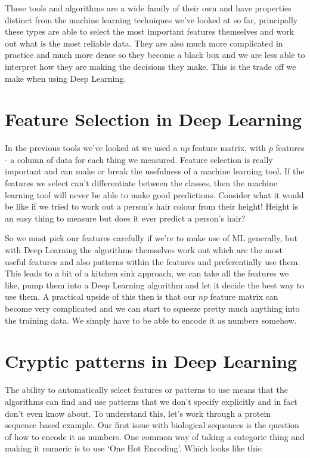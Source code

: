 \documentclass[
]{book}
\begin{document}
These tools and algorithms are a wide family of their own and have properties distinct from the machine learning techniques we've looked at so far, principally these types are able to select the most important features themselves and work out what is the most reliable data. They are also much more complicated in practice and much more dense so they become a black box and we are less able to interpret how they are making the decisions they make. This is the trade off we make when using Deep Learning.

\hypertarget{feature-selection-in-deep-learning}{%
\section{Feature Selection in Deep Learning}\label{feature-selection-in-deep-learning}}

In the previous tools we've looked at we used a \(np\) feature matrix, with \(p\) features - a column of data for each thing we measured. Feature selection is really important and can make or break the usefulness of a machine learning tool. If the features we select can't differentiate between the classes, then the machine learning tool will never be able to make good predictions. Consider what it would be like if we tried to work out a person's hair colour from their height! Height is an easy thing to measure but does it ever predict a person's hair?

So we must pick our features carefully if we're to make use of ML generally, but with Deep Learning the algorithms themselves work out which are the most useful features and also patterns within the features and preferentially use them. This leads to a bit of a kitchen sink approach, we can take all the features we like, pump them into a Deep Learning algorithm and let it decide the best way to use them. A practical upside of this then is that our \(np\) feature matrix can become very complicated and we can start to squeeze pretty much anything into the training data. We simply have to be able to encode it as numbers somehow.

\hypertarget{cryptic-patterns-in-deep-learning}{%
\section{Cryptic patterns in Deep Learning}\label{cryptic-patterns-in-deep-learning}}

The ability to automatically select features or patterns to use means that the algorithms can find and use patterns that we don't specify explicitly and in fact don't even know about. To understand this, let's work through a protein sequence based example. Our first issue with biological sequences is the question of how to encode it as numbers. One common way of taking a categoric thing and making it numeric is to use `One Hot Encoding'. Which looks like this:
\end{document}
